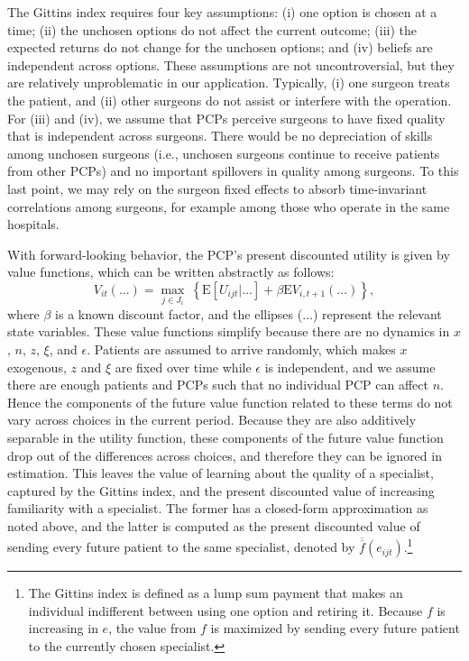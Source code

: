 \documentclass[12pt]{article}
\begin{document}
The Gittins index requires four key assumptions: (i) one option is chosen at a time; (ii) the unchosen options do not affect the current outcome; (iii) the expected returns do not change for the unchosen options; and (iv) beliefs are independent across options. These assumptions are not uncontroversial, but they are relatively unproblematic in our application. Typically, (i) one surgeon treats the patient, and (ii) other surgeons do not assist or interfere with the operation. For (iii) and (iv), we assume that PCPs perceive surgeons to have fixed quality that is independent across surgeons.  There would be no depreciation of skills among unchosen surgeons (i.e., unchosen surgeons continue to receive patients from other PCPs) and no important spillovers in quality among surgeons. To this last point, we may rely on the surgeon fixed effects to absorb time-invariant correlations among surgeons, for example among those who operate in the same hospitals.

With forward-looking behavior, the PCP's present discounted utility is given by value functions, which can be written abstractly as follows:
\begin{equation*}
V_{it}(\dots) = \max_{j \in J_i} \ \left\{ \mathrm{E} \left[ U_{ijt} | \dots \right]
+ \beta \mathrm{E} V_{i, t+1}(\dots) \right\},
\end{equation*}
where $\beta$ is a known discount factor, and the ellipses ($\dots$) represent the relevant state variables. These value functions simplify because there are no dynamics in $x$, $n$, $z$, $\xi$, and $\epsilon$. Patients are assumed to arrive randomly, which makes $x$ exogenous, $z$ and $\xi$ are fixed over time while $\epsilon$ is independent, and we assume there are enough patients and PCPs such that no individual PCP can affect $n$. Hence the components of the future value function related to these terms do not vary across choices in the current period. Because they are also additively separable in the utility function, these components of the future value function drop out of the differences across choices, and therefore they can be ignored in estimation. This leaves the value of learning about the quality of a specialist, captured by the Gittins index, and the present discounted value of increasing familiarity with a specialist. The former has a closed-form approximation as noted above, and the latter is computed as the present discounted value of sending every future patient to the same specialist, denoted by $\overline{\overline{f}}(e_{ijt})$.\footnote{The Gittins index is defined as a lump sum payment that makes an individual indifferent between using one option and retiring it.  Because $f$ is increasing in $e$, the value from $f$ is maximized by sending every future patient to the currently chosen specialist.}
\end{document}
